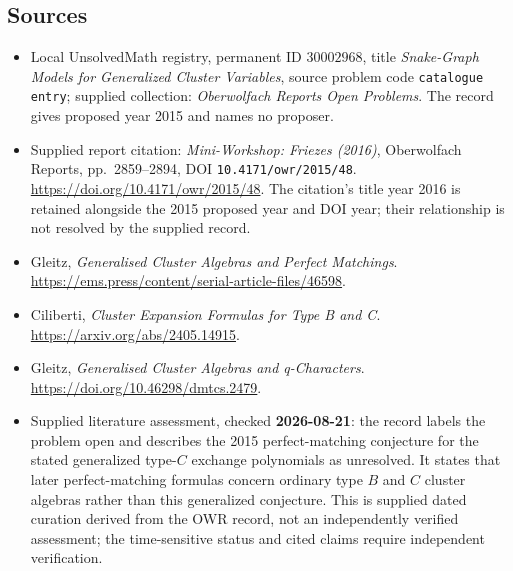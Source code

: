 \documentclass[11pt]{article}
\begin{document}
\subsection{Sources}
\begin{itemize}
\item Local UnsolvedMath registry, permanent ID \(30002968\), title \emph{Snake-Graph Models for Generalized Cluster Variables}, source problem code \texttt{catalogue entry}; supplied collection: \emph{Oberwolfach Reports Open Problems}. The record gives proposed year 2015 and names no proposer.
\item Supplied report citation: \emph{Mini-Workshop: Friezes (2016)}, Oberwolfach Reports, pp.\ 2859--2894, DOI \texttt{10.4171/owr/2015/48}. \url{https://doi.org/10.4171/owr/2015/48}. The citation's title year 2016 is retained alongside the 2015 proposed year and DOI year; their relationship is not resolved by the supplied record.
\item Gleitz, \emph{Generalised Cluster Algebras and Perfect Matchings}. \url{https://ems.press/content/serial-article-files/46598}.
\item Ciliberti, \emph{Cluster Expansion Formulas for Type B and C}. \url{https://arxiv.org/abs/2405.14915}.
\item Gleitz, \emph{Generalised Cluster Algebras and q-Characters}. \url{https://doi.org/10.46298/dmtcs.2479}.
\item Supplied literature assessment, checked \textbf{2026-08-21}: the record labels the problem open and describes the 2015 perfect-matching conjecture for the stated generalized type-\(C\) exchange polynomials as unresolved. It states that later perfect-matching formulas concern ordinary type \(B\) and \(C\) cluster algebras rather than this generalized conjecture. This is supplied dated curation derived from the OWR record, not an independently verified assessment; the time-sensitive status and cited claims require independent verification.
\end{itemize}
\end{document}
